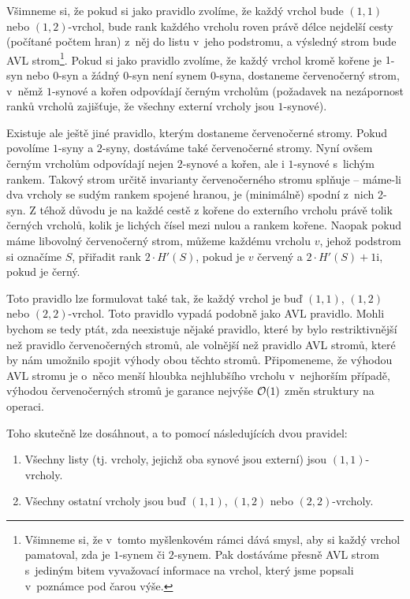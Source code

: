Všimneme si, že pokud si jako pravidlo zvolíme, že každý vrchol bude $(1,1)$
nebo $(1,2)$-vrchol, bude rank každého vrcholu roven právě délce nejdelší cesty
(počítané počtem hran) z~něj do listu v~jeho podstromu, a výsledný strom bude
AVL strom\footnote{Všimneme si, že v~tomto myšlenkovém rámci dává smysl, aby si každý vrchol pamatoval, zda je $1$-synem či $2$-synem. Pak dostáváme přesně AVL strom s~jediným bitem vyvažovací informace na vrchol, který jsme popsali v~poznámce pod čarou výše.}. Pokud si jako pravidlo zvolíme, že každý vrchol kromě kořene je
$1$-syn nebo $0$-syn a žádný $0$-syn není synem $0$-syna, dostaneme
červenočerný strom, v~němž $1$-synové a kořen odpovídají černým vrcholům (požadavek na
nezápornost ranků vrcholů zajišťuje, že všechny externí vrcholy jsou
$1$-synové).

Existuje ale ještě jiné pravidlo, kterým dostaneme červenočerné stromy. Pokud
povolíme $1$-syny a $2$-syny, dostáváme také červenočerné stromy. Nyní ovšem
černým vrcholům odpovídají nejen $2$-synové a kořen, ale i $1$-synové s~lichým rankem.
Takový strom určitě invarianty červenočerného stromu splňuje -- máme-li dva
vrcholy se sudým rankem spojené hranou, je (minimálně) spodní z~nich 2-syn. Z téhož důvodu je na každé cestě z kořene do externího vrcholu právě tolik černých vrcholů, kolik je lichých čísel mezi nulou a rankem kořene. 
Naopak pokud máme libovolný červenočerný strom, můžeme každému vrcholu $v$, jehož
podstrom si označíme $S$, přiřadit rank $2\cdot H'(S)$, pokud je $v$ červený a
$2\cdot H'(S) + 1$i, pokud je černý.

Toto pravidlo lze formulovat také tak, že každý vrchol je buď $(1,1)$, $(1,2)$ nebo $(2,2)$-vrchol. Toto pravidlo vypadá podobně jako AVL pravidlo. Mohli bychom se tedy ptát, zda neexistuje nějaké pravidlo, které by bylo restriktivnější než pravidlo červenočerných stromů, ale volnější než pravidlo AVL stromů, které by nám umožnilo spojit výhody obou těchto stromů. Připomeneme, že výhodou AVL stromu je o~něco menší hloubka nejhlubšího vrcholu v~nejhorším případě, výhodou červenočerných stromů je garance nejvýše $\mathcal O(1)$ změn struktury na operaci. 

Toho skutečně lze dosáhnout, a to pomocí následujících dvou pravidel:
\begin{enumerate}
\item Všechny listy (tj. vrcholy, jejichž oba synové jsou externí) jsou $(1,1)$-vrcholy.
\item Všechny ostatní vrcholy jsou buď $(1,1)$, $(1,2)$ nebo $(2,2)$-vrcholy.
\end{enumerate}

